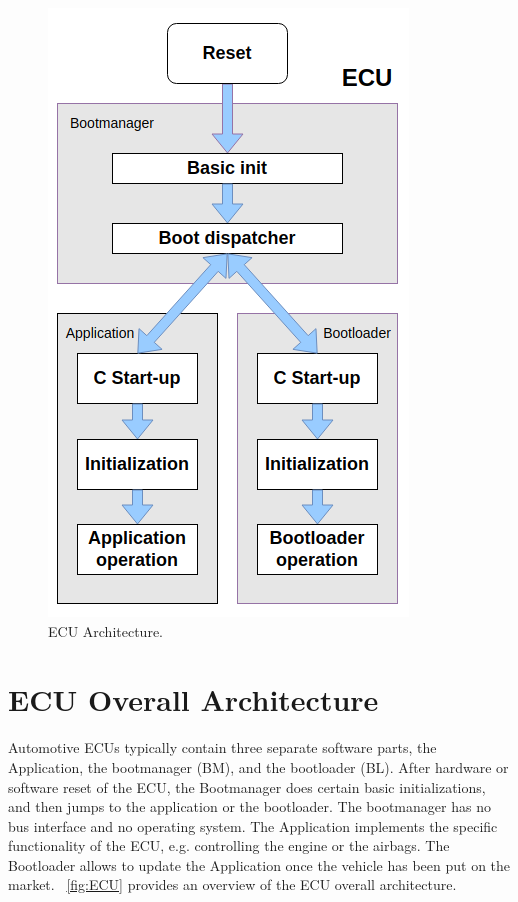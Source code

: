 \newpage
\begin{figure}
  \centering
  \includegraphics[width=0.9\linewidth]{figures/ECU.PNG}
  \caption{ECU Architecture.} \label{fig:ECU}
\end{figure}
\section{ECU Overall Architecture}\label{section:ECU_architecture}
Automotive ECUs typically contain three separate software parts, the Application, the bootmanager (BM), and the bootloader (BL).  After hardware or software reset of the ECU, the Bootmanager does certain basic initializations, and then jumps to the application or the bootloader. The bootmanager has no bus interface and no operating system. The Application implements the specific functionality of the ECU, e.g. controlling the engine or the airbags. The Bootloader allows to update the Application once the vehicle has been put on the market. ~\autoref{fig:ECU} provides an overview of the ECU overall architecture.

